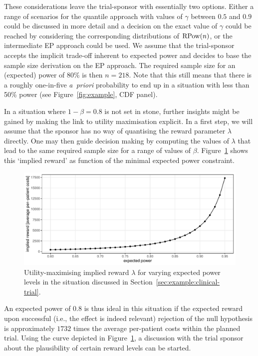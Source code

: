 \documentclass{article}
\begin{document}
These considerations leave the trial-sponsor with essentially two options.
Either a range of scenarios for the quantile approach with values of $\gamma$ between $0.5$ and $0.9$ could be discussed in more detail and a decision on the exact value of $\gamma$ could be reached by considering the corresponding distributions of $\operatorname{RPow}({ n })$, or the intermediate EP approach could be used.
We assume that the trial-sponsor accepts the implicit trade-off inherent to expected power and decides to base the sample size derivation on the EP approach.
The required sample size for an (expected) power of 80\% is then $n=218$.
Note that this still means that there is a roughly one-in-five \textit{a~priori} probability to end up in a situation with less than 50\% power (see Figure~\ref{fig:example}, CDF panel).

In a situation where $1-\beta=0.8$ is not set in stone, further insights might be gained by making the link to
utility maximisation explicit.
In a first step, we will assume that the sponsor has no way of quantising the reward parameter $\lambda$ directly.
One may then guide decision making by computing the values of $\lambda$ that lead to the same required sample size for a range of values of $\beta$.
Figure~\ref{fig:matched-reward} shows this `implied reward' as function of the minimal expected power constraint.
\begin{figure}
    \centering
    \includegraphics[width=\textwidth]{figures/fig7-matched-reward}
    \caption{%
        Utility-maximising implied reward $\lambda$ for varying expected power levels in the situation discussed in Section~\ref{sec:example:clinical-trial}.
    }
    \label{fig:matched-reward}
\end{figure}
An expected power of $0.8$ is thus ideal in this situation if the expected reward upon successful (i.e., the effect is indeed relevant) rejection of the null hypothesis is approximately $1732$ times the average per-patient costs within the planned trial.
Using the curve depicted in Figure~\ref{fig:matched-reward}, a discussion with the trial sponsor about the plausibility of certain reward levels can be started.
\end{document}
